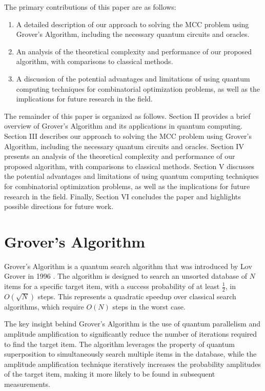 The primary contributions of this paper are as follows:

\begin{enumerate}
\item A detailed description of our approach to solving the MCC problem using Grover's Algorithm, including the necessary quantum circuits and oracles.
\item An analysis of the theoretical complexity and performance of our proposed algorithm, with comparisons to classical methods.
\item A discussion of the potential advantages and limitations of using quantum computing techniques for combinatorial optimization problems, as well as the implications for future research in the field.
\end{enumerate}

The remainder of this paper is organized as follows. Section II provides a brief overview of Grover's Algorithm and its applications in quantum computing. Section III describes our approach to solving the MCC problem using Grover's Algorithm, including the necessary quantum circuits and oracles. Section IV presents an analysis of the theoretical complexity and performance of our proposed algorithm, with comparisons to classical methods. Section V discusses the potential advantages and limitations of using quantum computing techniques for combinatorial optimization problems, as well as the implications for future research in the field. Finally, Section VI concludes the paper and highlights possible directions for future work.

\section{Grover's Algorithm}

Grover's Algorithm is a quantum search algorithm that was introduced by Lov Grover in 1996 \cite{grover1996fast}. The algorithm is designed to search an unsorted database of $N$ items for a specific target item, with a success probability of at least $\frac{1}{2}$, in $O(\sqrt{N})$ steps. This represents a quadratic speedup over classical search algorithms, which require $O(N)$ steps in the worst case.

The key insight behind Grover's Algorithm is the use of quantum parallelism and amplitude amplification to significantly reduce the number of iterations required to find the target item. The algorithm leverages the property of quantum superposition to simultaneously search multiple items in the database, while the amplitude amplification technique iteratively increases the probability amplitudes of the target item, making it more likely to be found in subsequent measurements.

